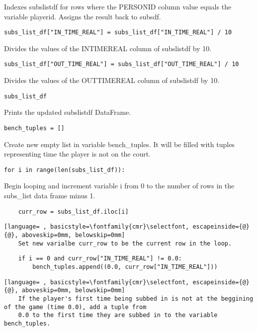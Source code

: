 \documentclass{article}
\begin{document}
Indexes subs\textunderscore list\textunderscore df for rows where the PERSON\textunderscore ID column value equals the variable player\textunderscore id. Assigns the result back to subs\textunderscore df.
\begin{lstlisting}
subs_list_df["IN_TIME_REAL"] = subs_list_df["IN_TIME_REAL"] / 10
\end{lstlisting}
Divides the values of the IN\textunderscore TIME\textunderscore REAL column of subs\textunderscore list\textunderscore df by 10.
\begin{lstlisting}
subs_list_df["OUT_TIME_REAL"] = subs_list_df["OUT_TIME_REAL"] / 10
\end{lstlisting}
Divides the values of the OUT\textunderscore TIME\textunderscore REAL column of subs\textunderscore list\textunderscore df by 10.
\begin{lstlisting}
subs_list_df
\end{lstlisting}
Prints the updated subs\textunderscore list\textunderscore df DataFrame.
\begin{lstlisting}
bench_tuples = []
\end{lstlisting}
Create new empty list in variable bench\_tuples. It will be filled with tuples representing time the player is not on the court.
\begin{lstlisting}
for i in range(len(subs_list_df)):
\end{lstlisting}
Begin looping and increment variable i from 0 to the number of rows in the subs\_list data frame minus 1.
\begin{lstlisting}
    curr_row = subs_list_df.iloc[i]
\end{lstlisting}
\begin{lstlisting}[language= , basicstyle=\fontfamily{cmr}\selectfont, escapeinside={@}{@}, aboveskip=0mm, belowskip=0mm]
    Set new varialbe curr_row to be the current row in the loop.
\end{lstlisting}
\begin{lstlisting}
    if i == 0 and curr_row["IN_TIME_REAL"] != 0.0:
        bench_tuples.append((0.0, curr_row["IN_TIME_REAL"]))
\end{lstlisting}
\begin{lstlisting}[language= , basicstyle=\fontfamily{cmr}\selectfont, escapeinside={@}{@}, aboveskip=0mm, belowskip=0mm]
    If the player's first time being subbed in is not at the beggining of the game (time 0.0), add a tuple from
    0.0 to the first time they are subbed in to the variable bench_tuples.
\end{lstlisting}
\end{document}

